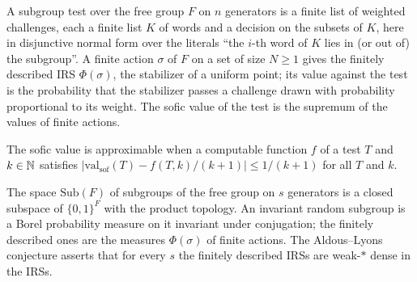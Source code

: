 \begin{definition}
\label{def:subgroup-test}
\leanok
A subgroup test over the free group $F$ on $n$ generators is a finite list of weighted
challenges, each a finite list $K$ of words and a decision on the subsets of $K$, here in
disjunctive normal form over the literals ``the $i$-th word of $K$ lies in (or out of) the
subgroup''. A finite action $\sigma$ of $F$ on a set of size $N \geq 1$ gives the finitely
described IRS $\Phi(\sigma)$, the stabilizer of a uniform point; its value against the test is the
probability that the stabilizer passes a challenge drawn with probability proportional to its
weight. The sofic value of the test is the supremum of the values of finite actions.
\end{definition}

\begin{definition}
\label{def:sofic-approximable}
\leanok
The sofic value is approximable when a computable function $f$ of a test $T$ and $k \in \mathbb{N}$
satisfies $|\mathrm{val}_{\mathrm{sof}}(T) - f(T, k)/(k+1)| \leq 1/(k+1)$ for all $T$ and $k$.
\end{definition}

\begin{definition}
\label{def:aldous-lyons}
\leanok
The space $\mathrm{Sub}(F)$ of subgroups of the free group on $s$ generators is a closed subspace
of $\{0,1\}^F$ with the product topology. An invariant random subgroup is a Borel probability
measure on it invariant under conjugation; the finitely described ones are the measures
$\Phi(\sigma)$ of finite actions. The Aldous--Lyons conjecture asserts that for every $s$ the
finitely described IRSs are weak-$*$ dense in the IRSs.
\end{definition}

